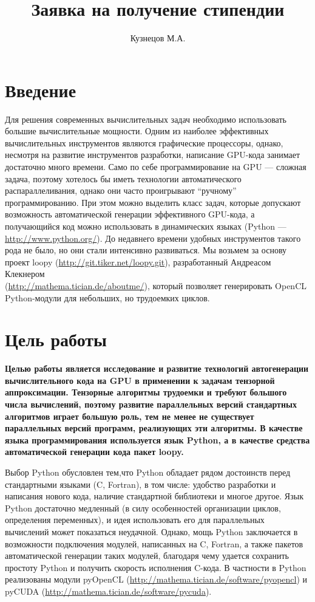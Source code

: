 \documentclass{scrartcl}
\title{Заявка на получение стипендии}
\author{Кузнецов М.А.}
\date{}
\begin{document}
\maketitle


\section{Введение}
\label{sec-1}

Для решения современных вычислительных задач необходимо использовать большие вычислительные мощности.
Одним из наиболее эффективных вычислительных инструментов являются графические процессоры, однако, 
несмотря на развитие инструментов разработки, написание GPU-кода занимает достаточно много времени.
Само по себе программирование на GPU --- сложная задача, поэтому хотелось бы 
иметь технологии автоматического распараллеливания, однако они часто проигрывают ``ручному''
программированию. При этом можно выделить класс задач, которые допускают возможность автоматической генерации
эффективного GPU-кода, а получающийся код можно использовать в динамических языках
(Python --- \href{http://www.python.org/}{http://www.python.org/}). До недавнего времени удобных инструментов такого рода не было,
но они стали интенсивно развиваться. Мы возьмем за основу проект loopy (\href{http://git.tiker.net/loopy.git}{http://git.tiker.net/loopy.git}),
 разработанный Андреасом Клекнером \\(\href{http://mathema.tician.de/aboutme/}{http://mathema.tician.de/aboutme/}),
который позволяет
генерировать OpenCL Python-модули для небольших, но трудоемких циклов.
\section{Цель работы}
\label{sec-2}


\bfseries Целью работы является исследование и развитие технологий автогенерации 
вычислительного кода на GPU в применении к задачам тензорной аппроксимации.\mdseries
Тензорные алгоритмы трудоемки и требуют большого числа вычислений, поэтому развитие параллельных 
версий стандартных алгоритмов играет большую роль, тем не менее 
не существует параллельных версий программ, реализующих эти алгоритмы.
В качестве языка программирования используется язык Python, а в качестве средства автоматической генерации кода пакет loopy.

Выбор Python обусловлен тем,что Python обладает рядом 
достоинств перед стандартными языками (C, Fortran), 
в том числе: удобство разработки и написания 
нового кода, наличие стандартной библиотеки и многое другое.
Язык Python достаточно медленный (в силу особенностей организации циклов, определения переменных),
и идея использовать его для параллельных вычислений может показаться неудачной.
Однако, мощь Python заключается в возможности подключения модулей, написанных на  C, Fortran, а также пакетов
автоматической генерации таких модулей, благодаря чему удается 
сохранить простоту Python и получить скорость исполнения C-кода. В частности 
в Python реализованы модули pyOpenCL (\href{http://mathema.tician.de/software/pyopencl}{http://mathema.tician.de/software/pyopencl}) и
 pyCUDA (\href{http://mathema.tician.de/software/pycuda}{http://mathema.tician.de/software/pycuda}).
\end{document}
